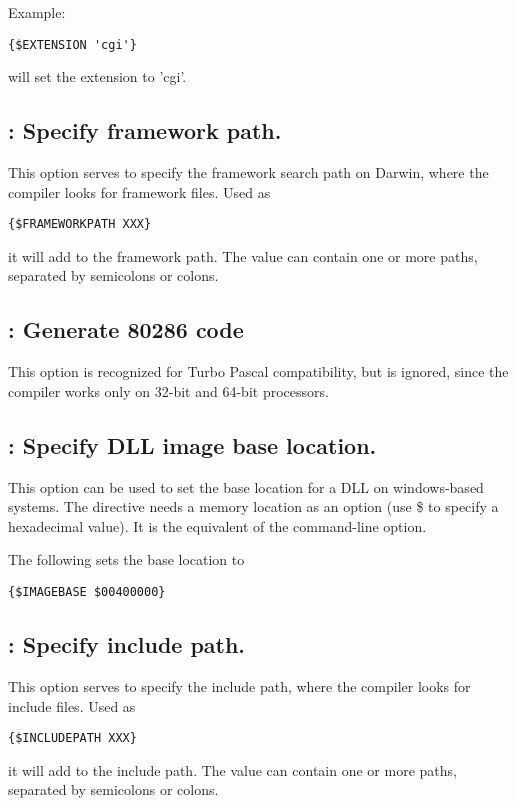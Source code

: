 Example:
\begin{verbatim}
{$EXTENSION 'cgi'}
\end{verbatim}
will set the extension to 'cgi'.

\subsection{ : Specify framework path.}
This option serves to specify the framework search path on Darwin, 
where the compiler looks for framework files. Used as
\begin{verbatim}  
{$FRAMEWORKPATH XXX}
\end{verbatim}
it will add  to the framework path. The value  can contain
one or more paths, separated by semicolons or colons.


\subsection{ : Generate 80286 code}

This option is recognized for Turbo Pascal compatibility, but is ignored,
since the compiler works only on 32-bit and 64-bit processors.

\subsection{ : Specify DLL image base location.}
This option can be used to set the base location for a DLL on windows-based
systems. The directive needs a memory location as an option (use \$ to
specify a hexadecimal value). It is the equivalent of the  command-line option.

The following sets the base location to 
\begin{verbatim}
{$IMAGEBASE $00400000}
\end{verbatim}

\subsection{ : Specify include path.}

This option serves to specify the include path, where the compiler looks for
include files. Used as
\begin{verbatim}
{$INCLUDEPATH XXX}
\end{verbatim}
it will add  to the include path. The value  can contain one or more paths, 
separated by semicolons or colons.

